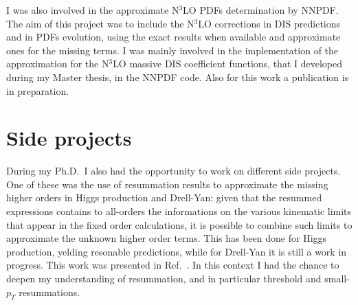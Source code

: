 \documentclass[11pt,a4paper]{moderncv}        %
\begin{document}
I was also involved in the approximate N$^3$LO PDFs determination by NNPDF.
The aim of this project was to include the N$^3$LO corrections in DIS predictions and in PDFs evolution,
using the exact results when available and approximate ones for the missing terms.
I was mainly involved in the implementation of the approximation for the N$^3$LO massive DIS coefficient functions, that I developed
during my Master thesis, in the NNPDF code.
Also for this work a publication is in preparation.

\section{Side projects}

During my Ph.D.\ I also had the opportunity to work on different side projects.
%
One of these was the use of resummation results to approximate the missing higher orders in Higgs production and Drell-Yan:
given that the resummed expressions
contains to all-orders the informations on the various kinematic limits that appear in the fixed order calculations, it is possible
to combine such limits to approximate the unknown higher order terms.
This has been done for Higgs production, yelding resonable predictions, while for Drell-Yan it is still a work in progress.
This work was presented in Ref.~\cite{laurenti2022approximating}.
In this context I had the chance to deepen my understanding of resummation, and in particular threshold and small-$p_T$ resummations.
\end{document}
